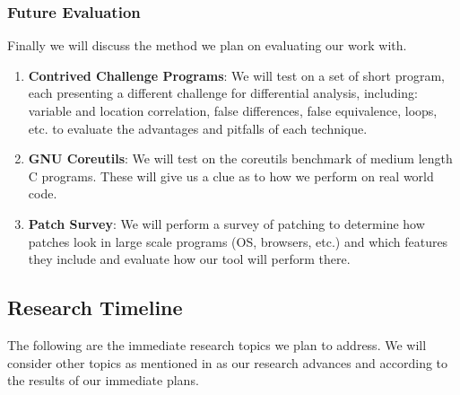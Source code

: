 \subsubsection{Future Evaluation}

Finally we will discuss the method we plan on evaluating our work with.
\begin{enumerate}
\item \textbf{Contrived Challenge Programs}: We will test on a set of short program, each presenting a different challenge for differential analysis, including: variable and location correlation, false differences, false equivalence, loops, etc. to evaluate the advantages and pitfalls of each technique.
\item \textbf{GNU Coreutils}: We will test on the coreutils benchmark of medium length C programs. These will give us a clue as to how we perform on real world code.
\item \textbf{Patch Survey}: We will perform a survey of patching to determine how patches look in large scale programs (OS, browsers, etc.) and which features they include and evaluate how our tool will perform there.
\end{enumerate}


\subsection{Research Timeline}
The following are the immediate research topics we plan to address. We will consider other topics as mentioned in  as our research advances and according to the results of our immediate plans.

